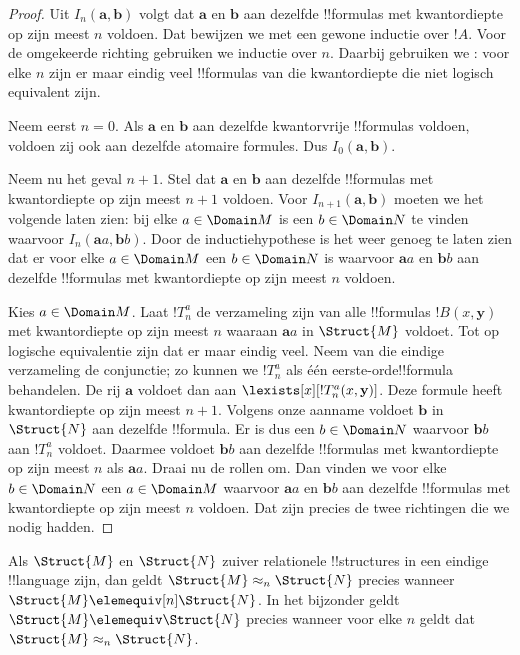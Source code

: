 \documentclass[openany]{memoir}
\begin{document}
\begin{proof}
  Uit $I_n(\mathbf{a},\mathbf{b})$ volgt dat $\mathbf{a}$ en
  $\mathbf{b}$ aan dezelfde !!{formula}s met kwantordiepte op zijn
  meest $n$ voldoen. Dat bewijzen we met een gewone inductie over $!A$.
  Voor de omgekeerde richting gebruiken we inductie over $n$. Daarbij
  gebruiken we : voor elke $n$ zijn er maar
  eindig veel !!{formula}s van die kwantordiepte die niet logisch
  equivalent zijn.

  Neem eerst $n=0$. Als $\mathbf{a}$ en $\mathbf{b}$ aan dezelfde
  kwantorvrije !!{formula}s voldoen, voldoen zij ook aan dezelfde
  atomaire formules. Dus $I_0(\mathbf{a},\mathbf{b})$.

  Neem nu het geval $n+1$. Stel dat $\mathbf{a}$ en $\mathbf{b}$ aan
  dezelfde !!{formula}s met kwantordiepte op zijn meest $n+1$ voldoen.
  Voor $I_{n+1}(\mathbf{a},\mathbf{b})$ moeten we het volgende laten
  zien: bij elke $a \in \Domain M$ is een $b \in \Domain N$ te vinden
  waarvoor $I_n(\mathbf{a}a,\mathbf{b}b)$. Door de inductiehypothese is
  het weer genoeg te laten zien dat er voor elke $a \in \Domain M$ een
  $b \in \Domain N$ is waarvoor $\mathbf{a}a$ en $\mathbf{b}b$ aan
  dezelfde !!{formula}s met kwantordiepte op zijn meest $n$ voldoen.

  Kies $a \in \Domain M$. Laat $!T^a_n$ de verzameling zijn van alle
  !!{formula}s $!B(x,\mathbf{y})$ met kwantordiepte op zijn meest $n$
  waaraan $\mathbf{a}a$ in $\Struct{M}$ voldoet. Tot op logische
  equivalentie zijn dat er maar eindig veel. Neem van die eindige
  verzameling de conjunctie; zo kunnen we $!T^a_n$ als één
  eerste-orde!!{formula} behandelen. De rij $\mathbf{a}$ voldoet dan
  aan $\lexists[x][!T^a_n(x,\mathbf{y})]$. Deze formule heeft
  kwantordiepte op zijn meest $n+1$. Volgens onze aanname voldoet
  $\mathbf{b}$ in $\Struct{N}$ aan dezelfde !!{formula}. Er is dus een
  $b \in \Domain N$ waarvoor $\mathbf{b}b$ aan $!T^a_n$ voldoet.
  Daarmee voldoet $\mathbf{b}b$ aan dezelfde !!{formula}s met
  kwantordiepte op zijn meest $n$ als $\mathbf{a}a$.
  Draai nu de rollen om. Dan vinden we voor elke $b \in \Domain N$ een
  $a\in \Domain M$ waarvoor $\mathbf{a}a$ en $\mathbf{b}b$ aan
  dezelfde !!{formula}s met kwantordiepte op zijn meest $n$ voldoen.
  Dat zijn precies de twee richtingen die we nodig hadden.
\end{proof}

\begin{cor}
  Als $\Struct{M}$ en $\Struct{N}$ zuiver relationele !!{structure}s
  in een eindige !!{language} zijn, dan geldt
  $\Struct{M} \approx_n\Struct{N}$ precies wanneer
  $\Struct{M} \elemequiv[n] \Struct{N}$. In het bijzonder geldt
  $\Struct{M} \elemequiv \Struct{N}$ precies wanneer voor elke $n$
  geldt dat $\Struct{M} \approx_n \Struct{N}$.
\end{cor}
\endgroup
\end{document}

